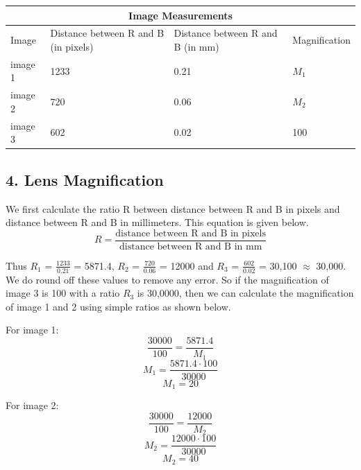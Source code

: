 \documentclass{article}
\begin{document}
\begin{tabular}{ |p{3cm}||p{3cm}|p{3cm}|p{3cm}|  }
 \hline
 \multicolumn{4}{|c|}{Image Measurements} \\
 \hline
Image & Distance between R and B (in pixels) &Distance between R and B (in mm) & Magnification\\
 \hline 
 image 1 & 1233  & 0.21 &  $M_{1}$\\ 
 image 2 & 720  &  0.06 &  $M_{2}$\\ 
 image 3 & 602  &  0.02 &  100\\ 
 \hline
\end{tabular}

\subsection*{4. Lens Magnification}

We first calculate the ratio R between distance between R and B in pixels and distance between R and B in millimeters. This equation is given below. 
\begin{equation}
R = \frac{\text{distance between R and B in pixels} }{\text{distance between R and B in mm}}
\end{equation}

Thus $R_{1}$ = $\frac{1233}{0.21}$ = 5871.4, $R_{2}$ = $\frac{720}{0.06}$ = 12000 and $R_{3}$ = $\frac{602}{0.02}$ = 30,100 $\approx$ 30,000. 
~\\ We do round off these values to remove any error. So if the magnification of image 3 is 100 with a ratio $R_{3}$ is 30,0000, then we can calculate the magnification of image 1 and 2 using simple ratios as shown below.

For image 1: 
\begin{equation}
\frac{30000}{100} = \frac{5871.4}{M_{1}}
\end{equation}
\begin{equation}
M_{1} = \frac{5871.4 \cdot 100}{30000}
\end{equation}
\begin{equation}
M_{1} = 20
\end{equation}

For image 2:
\begin{equation}
\frac{30000}{100} = \frac{12000}{M_{2}}
\end{equation}
\begin{equation}
M_{2} = \frac{12000 \cdot100}{30000}
\end{equation}
\begin{equation}
M_{2} = 40
\end{equation}
\end{document}
